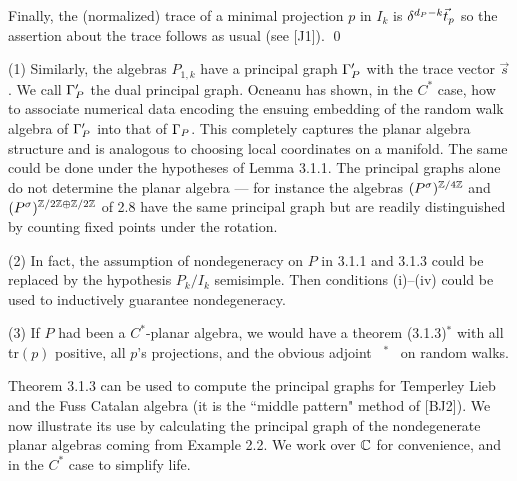 Finally, the (normalized) trace of a minimal projection $p$ in
$I_k$ is $\delta^{d_P-k}\vec t_p$ so the assertion about the trace
follows as usual (see [J1]). \qed

 (1) Similarly, the algebras $P_{1,k}$ have a
principal graph $\Gamma'_P$ with the trace vector $\vec s$. We call
$\Gamma'_P$ the dual principal graph. Ocneanu has shown, in the $C^*$
case,  how to associate numerical data encoding the ensuing
embedding of the random walk algebra of $\Gamma'_P$ into that of
$\Gamma_P$. This completely captures the planar algebra structure and
is analogous to choosing local coordinates on a manifold. The same
could be done under the hypotheses of Lemma 3.1.1. The principal
graphs alone do not determine the planar algebra --- for instance
the algebras $(P^\sigma)^{\mathbb Z/4\mathbb Z}$ and
$(P^\sigma)^{\mathbb Z/2\mathbb Z\oplus\mathbb Z/2\mathbb Z}$ of 2.8 have the same principal graph
but are readily distinguished by counting fixed points under the
rotation.

(2) In fact, the assumption of nondegeneracy on $P$ in 3.1.1 and
3.1.3 could be replaced by the hypothesis $P_k/I_k$ semisimple.
Then conditions (i)--(iv) could be  used to inductively guarantee
nondegeneracy.

(3) If $P$ had been a $C^*$-planar algebra, we would have a
theorem (3.1.3)${}^*$ with all tr$(p)$ positive, all $p$'s
projections, and the obvious adjoint \ ${}^*$ \  on random walks.

\bs
Theorem 3.1.3 can be used to compute the principal graphs for
Temperley Lieb and the Fuss Catalan algebra (it is the ``middle
pattern" method of [BJ2]). We now illustrate its use by
calculating the principal graph of the nondegenerate planar
algebras coming from Example 2.2. We work over $\Bbb C$ for
convenience, and in the
$C^*$ case to simplify life.


